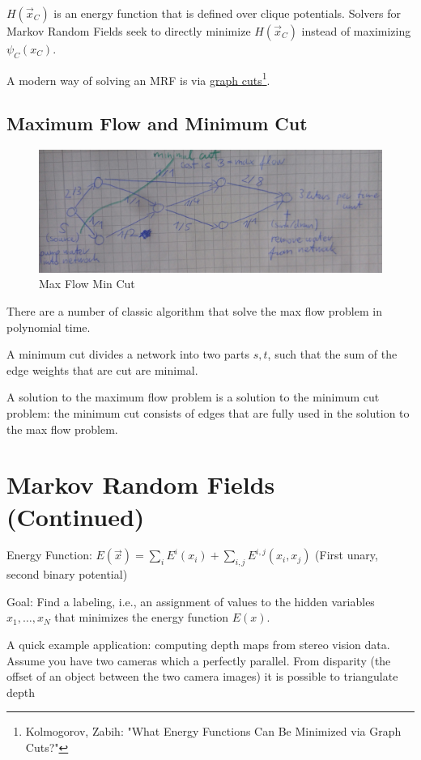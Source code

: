 \documentclass{scrartcl}
\begin{document}
\bigskip

\(H(\vec{x}_C)\) is an energy function that is defined over clique potentials. Solvers for Markov Random Fields seek to directly minimize \(H(\vec{x}_C)\) instead of maximizing \(\psi_C(x_C)\).

A modern way of solving an MRF is via \underline{graph cuts}\footnote{ Kolmogorov, Zabih: "What Energy Functions Can Be Minimized via Graph Cuts?"}.

\subsection{Maximum Flow and Minimum Cut}
\begin{figure}[ht]
	\centering
    \includegraphics[scale=0.13]{img/mrf_2.jpg}
	\caption{Max Flow Min Cut}
	\label{fig:mrf_2}
\end{figure}

There are a number of classic algorithm that solve the max flow problem in polynomial time.

A minimum cut divides a network into two parts \(s, t\), such that the sum of the edge weights that are cut are minimal.

A solution to the maximum flow problem is a solution to the minimum cut problem: the minimum cut consists of edges that are fully used in the solution to the max flow problem.

\section{Markov Random Fields (Continued)}
Energy Function: \(E(\vec{x}) = \sum_i E^i(x_i) + \sum_{i,j} E^{i,j}(x_i, x_j)\) (First unary, second binary potential)

Goal: Find a labeling, i.e., an assignment of values to the hidden variables \(x_1, \dots, x_N\) that minimizes the energy function \(E(x)\).

A quick example application: computing depth maps from stereo vision data. Assume you have two cameras which a perfectly parallel. From disparity (the offset of an object between the two camera images) it is possible to triangulate depth
\end{document}
